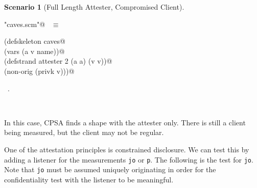 \documentclass[titlepage,12pt]{article}
\theoremstyle{definition}
\newtheorem{scenario}{Scenario}
\begin{document}
\begin{scenario}[Full Length Attester, Compromised Client]
\begin{flushleft} \small
\begin{minipage}{\linewidth} \label{scrap27}
\verb@"caves.scm"@\nobreak\ {\footnotesize {} }$\equiv$
\vspace{-1ex}
\begin{list}{}{} \item
\mbox{}\verb@(defskeleton caves@\\
\mbox{}\verb@  (vars (a v name))@\\
\mbox{}\verb@  (defstrand attester 2 (a a) (v v))@\\
\mbox{}\verb@  (non-orig (privk v)))@{\NWsep}
\end{list}
\vspace{-1ex}
\footnotesize\addtolength{\baselineskip}{-1ex}
\begin{list}{}{\setlength{\itemsep}{-\parsep}\setlength{\itemindent}{-\leftmargin}}
\item \NWtxtFileDefBy\ .
\end{list}
\end{minipage}\\[4ex]
\end{flushleft}
\end{scenario}

In this case, CPSA finds a shape with the attester only.
There is still a client being measured, but the client
may not be regular.

One of the attestation principles is constrained disclosure.
We can test this by adding a listener for the measurements
\texttt{jo} or \texttt{p}. The following is
the test for \texttt{jo}. Note that \texttt{jo} must be
assumed uniquely originating in order for the confidentiality
test with the listener to be meaningful.
\end{document}
